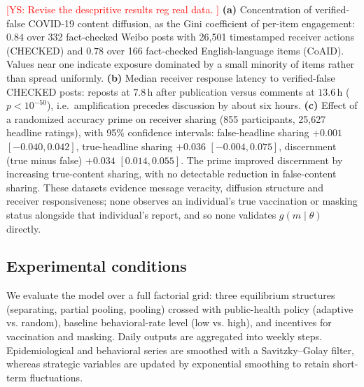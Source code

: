 \documentclass[sigconf,review]{acmart}
\newcommand{\ys}[1]{\textcolor{red}{[YS: #1]}}
\begin{document}
\ys{Revise the descpritive results reg real data. }
\textbf{(a)} Concentration of verified-false COVID-19 content diffusion, as the Gini coefficient of per-item engagement: $0.84$ over 332 fact-checked Weibo posts with 26{,}501 timestamped receiver actions (CHECKED) and $0.78$ over 166 fact-checked English-language items (CoAID). Values near one indicate exposure dominated by a small minority of items rather than spread uniformly. \textbf{(b)} Median receiver response latency to verified-false CHECKED posts: reposts at $7.8$\,h after publication versus comments at $13.6$\,h ($p<10^{-50}$), i.e.\ amplification precedes discussion by about six hours. \textbf{(c)} Effect of a randomized accuracy prime on receiver sharing (855 participants, 25{,}627 headline ratings), with 95\% confidence intervals: false-headline sharing $+0.001$ $[-0.040, 0.042]$, true-headline sharing $+0.036$ $[-0.004, 0.075]$, discernment (true minus false) $+0.034$ $[0.014, 0.055]$. The prime improved discernment by increasing true-content sharing, with no detectable reduction in false-content sharing. These datasets evidence message veracity, diffusion structure and receiver responsiveness; none observes an individual's true vaccination or masking status alongside that individual's report, and so none validates $g(m\mid\theta)$ directly.

\subsection{Experimental conditions}
We evaluate the model over a full factorial grid: three equilibrium structures (separating, partial pooling, pooling) crossed with public-health policy (adaptive vs. random), baseline behavioral-rate level (low vs. high), and incentives for vaccination and masking.
Daily outputs are aggregated into weekly steps. Epidemiological and behavioral series are smoothed with a Savitzky–Golay filter, whereas strategic variables are updated by exponential smoothing to retain short-term fluctuations.
\end{document}
